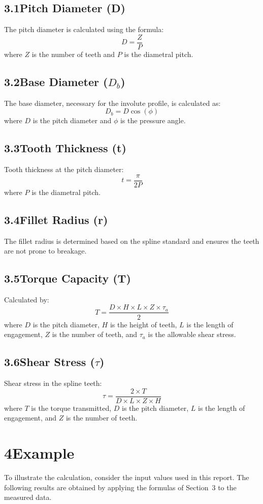\documentclass[14pt]{article}
\begin{document}
\subsection*{3.1\quad Pitch Diameter (D)}
The pitch diameter is calculated using the formula:
\[ D = \frac{Z}{P} \]
where $Z$ is the number of teeth and $P$ is the diametral pitch.

\subsection*{3.2\quad Base Diameter ($D_b$)}
The base diameter, necessary for the involute profile, is calculated as:
\[ D_b = D\cos(\phi) \]
where $D$ is the pitch diameter and $\phi$ is the pressure angle.

\subsection*{3.3\quad Tooth Thickness (t)}
Tooth thickness at the pitch diameter:
\[ t = \frac{\pi}{2P} \]
where $P$ is the diametral pitch.

\subsection*{3.4\quad Fillet Radius (r)}
The fillet radius is determined based on the spline standard and ensures the teeth are not prone
to breakage.

\subsection*{3.5\quad Torque Capacity (T)}
Calculated by:
\[ T = \frac{D \times H \times L \times Z \times \tau_a}{2} \]
where $D$ is the pitch diameter, $H$ is the height of teeth, $L$ is the length of engagement,
$Z$ is the number of teeth, and $\tau_a$ is the allowable shear stress.

\subsection*{3.6\quad Shear Stress ($\tau$)}
Shear stress in the spline teeth:
\[ \tau = \frac{2 \times T}{D \times L \times Z \times H} \]
where $T$ is the torque transmitted, $D$ is the pitch diameter, $L$ is the length of engagement,
and $Z$ is the number of teeth.

\section*{4\quad Example}
To illustrate the calculation, consider the input values used in this report. The following
results are obtained by applying the formulas of Section~3 to the measured data.
\end{document}
